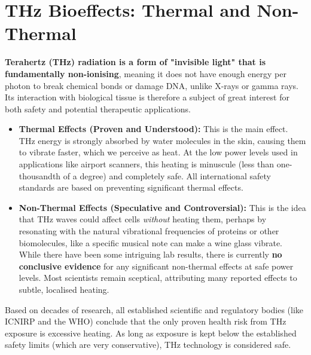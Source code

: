 
\chapter{THz Bioeffects: Thermal and Non-Thermal}
\label{ch:thz-bioeffects}

\begin{nontechnical}
    \textbf{Terahertz (THz) radiation is a form of "invisible light" that is fundamentally non-ionising}, meaning it does not have enough energy per photon to break chemical bonds or damage DNA, unlike X-rays or gamma rays. Its interaction with biological tissue is therefore a subject of great interest for both safety and potential therapeutic applications.

    \begin{itemize}
        \item \textbf{Thermal Effects (Proven and Understood):} This is the main effect. THz energy is strongly absorbed by water molecules in the skin, causing them to vibrate faster, which we perceive as heat. At the low power levels used in applications like airport scanners, this heating is minuscule (less than one-thousandth of a degree) and completely safe. All international safety standards are based on preventing significant thermal effects.
        \item \textbf{Non-Thermal Effects (Speculative and Controversial):} This is the idea that THz waves could affect cells \emph{without} heating them, perhaps by resonating with the natural vibrational frequencies of proteins or other biomolecules, like a specific musical note can make a wine glass vibrate. While there have been some intriguing lab results, there is currently \textbf{no conclusive evidence} for any significant non-thermal effects at safe power levels. Most scientists remain sceptical, attributing many reported effects to subtle, localised heating.
    \end{itemize}

    Based on decades of research, all established scientific and regulatory bodies (like ICNIRP and the WHO) conclude that the only proven health risk from THz exposure is excessive heating. As long as exposure is kept below the established safety limits (which are very conservative), THz technology is considered safe.
\end{nontechnical}


